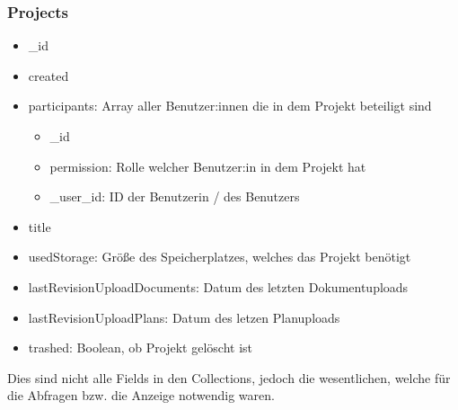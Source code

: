 \subsubsection{Projects}
\begin{itemize}
    \item \_id
    \item created
    \item participants: Array aller Benutzer:innen die in dem Projekt beteiligt sind
        \begin{itemize}
            \item \_id
            \item permission: Rolle welcher Benutzer:in in dem Projekt hat
            \item \_user\_id: ID der Benutzerin / des Benutzers
        \end{itemize}
    \item title
    \item usedStorage: Größe des Speicherplatzes, welches das Projekt benötigt
    \item lastRevisionUploadDocuments: Datum des letzten Dokumentuploads
    \item lastRevisionUploadPlans: Datum des letzen Planuploads
    \item trashed: Boolean, ob Projekt gelöscht ist
\end{itemize}
Dies sind nicht alle Fields in den Collections, jedoch die wesentlichen, welche für die Abfragen bzw. die Anzeige notwendig waren.